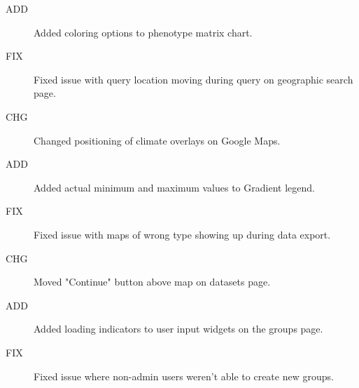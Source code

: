 \begin{description}
	  \item[ADD] Added coloring options to phenotype matrix chart.
	  \item[FIX] Fixed issue with query location moving during query on geographic search page.
	  \item[CHG] Changed positioning of climate overlays on Google Maps.
	  \item[ADD] Added actual minimum and maximum values to Gradient legend.
	  \item[FIX] Fixed issue with maps of wrong type showing up during data export.
	  \item[CHG] Moved "Continue" button above map on datasets page.
	  \item[ADD] Added loading indicators to user input widgets on the groups page.
	  \item[FIX] Fixed issue where non-admin users weren't able to create new groups.
\end{description}

